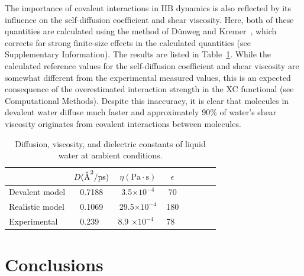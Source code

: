 \documentclass[aps,prl,reprint,amsmath,amssymb]{revtex4-1}
\begin{document}
The importance of covalent interactions in HB dynamics is also reflected by its influence on the self-diffusion coefficient and shear viscosity. 
Here, both of these quantities are calculated using the method of D\"unweg and Kremer~\cite{dunweg1993molecular}, which corrects for strong finite-size effects in the calculated quantities (see Supplementary Information). The results are listed in Table~\ref{Tab:dfs}. 
While the calculated reference values for the self-diffusion coefficient and shear viscosity are somewhat different from the experimental measured values, this is an expected consequence of the overestimated interaction strength in the XC functional (see Computational Methods). 
Despite this inaccuracy, it is clear that molecules in devalent water diffuse much faster and approximately 90\% of water's shear viscosity originates from covalent interactions between molecules.

\begin{table}
\caption{Diffusion, viscosity, and dielectric constants of liquid water at ambient conditions.}\label{Tab:dfs}
\begin{tabular}{l*{6}{c}r}
\hline
               & $D (\mathring{\text{A}}^2/\text{ps})$ & $\eta (\text{Pa}\cdot \text{s})$ & $\epsilon$ \\
\hline
Devalent model                & 0.7188 & 3.5$\times 10^{-4}$ & 70 \\
%
Realistic model              & 0.1069 & 29.5$\times 10^{-4}$ & 180 \\
%
Experimental            & 0.239~\cite{hardy2001isotope}  & 8.9 $\times 10^{-4} $~\cite{harris2004temperature} & 78~\cite{haynes2014crc}
\end{tabular}
\end{table}
 
\section{Conclusions}
\end{document}

